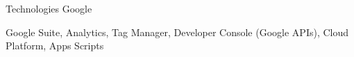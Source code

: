 \begin{cventries}
	\zcventry
	{Technologies Google} %
	{
		\begin{cvitems} %
			\item {Google Suite, Analytics, Tag Manager, Developer Console (Google APIs), Cloud Platform, Apps Scripts}
		\end{cvitems}
	}
	
\end{cventries}


